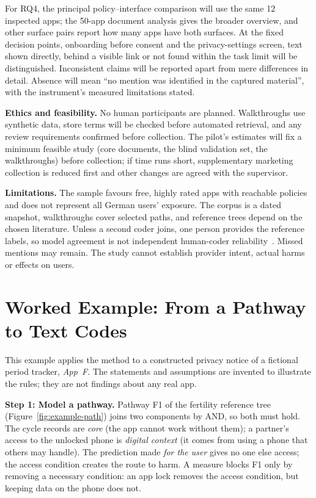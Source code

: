 \documentclass[sigconf,nonacm,natbib=false]{acmart}
\begin{document}
For RQ4, the principal policy--interface comparison will use the same 12
inspected apps; the 50-app document analysis gives the broader overview, and
other surface pairs report how many apps have both surfaces. At the fixed
decision points, onboarding before consent and the privacy-settings screen,
text shown directly, behind a visible link or not found within the task limit
will be distinguished. Inconsistent claims will be reported apart from mere
differences in detail. Absence will mean \enquote{no mention was identified
in the captured material}, with the instrument's measured limitations stated.

\textbf{Ethics and feasibility.} No human participants are planned.
Walkthroughs use synthetic data, store terms will be checked before automated
retrieval, and any review requirements confirmed before collection. The
pilot's estimates will fix a minimum feasible study (core documents, the blind
validation set, the walkthroughs) before collection; if time runs short,
supplementary marketing collection is reduced first and other changes are
agreed with the supervisor.

\textbf{Limitations.} The sample favours free, highly rated apps with reachable
policies and does not represent all German users' exposure. The corpus is a
dated snapshot, walkthroughs cover selected paths, and reference trees depend
on the chosen literature. Unless a second coder joins, one person provides the
reference labels, so model agreement is not independent human-coder
reliability~\parencite{mcdonald2019reliability}. Missed mentions may remain.
The study cannot establish provider intent, actual harms or effects on users.

\clearpage
\balance
\printbibliography[title={References}]

\onecolumn
\appendix
\section{Worked Example: From a Pathway to Text Codes}
\label{app:example}

This example applies the method to a constructed privacy notice of a
fictional period tracker, \emph{App~F}. The statements and assumptions are
invented to illustrate the rules; they are not findings about any real app.

\textbf{Step 1: Model a pathway.} Pathway F1 of the fertility reference tree
(Figure~\ref{fig:example-path}) joins two components by AND, so both must
hold. The cycle records are \emph{core} (the app cannot work without them); a
partner's access to the unlocked phone is \emph{digital context} (it comes
from using a phone that others may handle). The prediction made \emph{for the
user} gives no one else access; the access condition creates the route to
harm. A measure blocks F1 only by removing a necessary condition: an app lock
removes the access condition, but keeping data on the phone does not.
\end{document}
